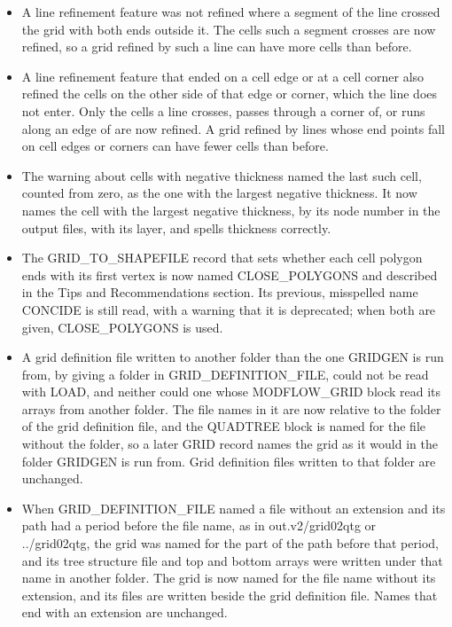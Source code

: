 \begin{itemize}[label=--]
  \item A line refinement feature was not refined where a segment of the line crossed the grid with both ends outside it. The cells such a segment crosses are now refined, so a grid refined by such a line can have more cells than before.
  \item A line refinement feature that ended on a cell edge or at a cell corner also refined the cells on the other side of that edge or corner, which the line does not enter. Only the cells a line crosses, passes through a corner of, or runs along an edge of are now refined. A grid refined by lines whose end points fall on cell edges or corners can have fewer cells than before.
  \item The warning about cells with negative thickness named the last such cell, counted from zero, as the one with the largest negative thickness. It now names the cell with the largest negative thickness, by its node number in the output files, with its layer, and spells thickness correctly.
  \item The GRID\_TO\_SHAPEFILE record that sets whether each cell polygon ends with its first vertex is now named CLOSE\_POLYGONS and described in the Tips and Recommendations section. Its previous, misspelled name CONCIDE is still read, with a warning that it is deprecated; when both are given, CLOSE\_POLYGONS is used.
  \item A grid definition file written to another folder than the one GRIDGEN is run from, by giving a folder in GRID\_DEFINITION\_FILE, could not be read with LOAD, and neither could one whose MODFLOW\_GRID block read its arrays from another folder. The file names in it are now relative to the folder of the grid definition file, and the QUADTREE block is named for the file without the folder, so a later GRID record names the grid as it would in the folder GRIDGEN is run from. Grid definition files written to that folder are unchanged.
  \item When GRID\_DEFINITION\_FILE named a file without an extension and its path had a period before the file name, as in out.v2/grid02qtg or ../grid02qtg, the grid was named for the part of the path before that period, and its tree structure file and top and bottom arrays were written under that name in another folder. The grid is now named for the file name without its extension, and its files are written beside the grid definition file. Names that end with an extension are unchanged.

\end{itemize}
